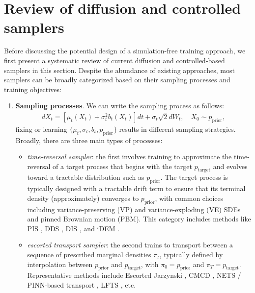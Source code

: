 \vspace{-5pt}
\section{Review of diffusion and controlled samplers}\label{sec:review}
\vspace{-5pt}
Before discussing the potential design of a simulation-free training approach, we first present a systematic review of current diffusion and controlled-based samplers in this section.
Despite the abundance of existing approaches, most samplers can be broadly categorized based on their sampling processes and training objectives:\vspace{-3pt}
\begin{enumerate}[leftmargin=*]
    \item \textbf{Sampling processes}. We can write the sampling process as follows:
    \begin{align}\label{eq:x}
        d X_t = \left [\mu_t(X_t) + \sigma_t^2 b_t(X_t) \right] dt + \sigma_t \sqrt{2} dW_t, \quad X_0 \sim p_\text{prior},
    \end{align}
    fixing or learning $\{\mu_t, \sigma_t, b_t, p_\text{prior}\}$ results in different sampling strategies. 
    Broadly, there are three main types of processes:
    \begin{itemize}[leftmargin=*]
        \item  \emph{time-reversal sampler}: the first involves training  to approximate the time-reversal of a target process that begins with the target  $p_\text{target}$ and evolves toward a tractable distribution such as $p_\text{prior}$. 
        The target process is typically designed with a tractable drift term to ensure that its terminal density (approximately) converges to $p_\text{prior}$, with common choices including variance-preserving (VP) and variance-exploding (VE) SDEs and pinned Brownian motion (PBM).
        This category includes methods like PIS \citep{zhangpath,vargas2021bayesian}, DDS \citep{vargasdenoising}, DIS \citep{berneroptimal}, and iDEM \citep{akhounditerated}.
        \item \emph{escorted transport sampler}: the second trains  to transport between a sequence of prescribed marginal densities $\pi_t$, typically defined by interpolation between $p_{\text{prior}}$ and $p_{\text{target}}$, with $\pi_0 = p_{\text{prior}}$ and $\pi_T = p_{\text{target}}$.
    Representative methods include Escorted Jarzynski \citep{vaikuntanathan2011escorted},  CMCD \citep{vargas2024transport}, NETS / PINN-based transport \citep{mate2023learning,albergo2024nets}, LFTS \citep{tian2024liouville}, etc.

\end{itemize}
\end{enumerate}

